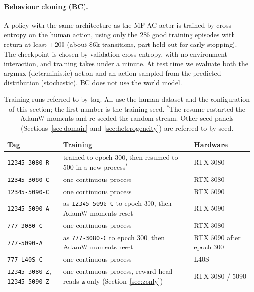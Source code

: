 \documentclass[11pt]{article}
\theoremstyle{remark}
\begin{document}
\paragraph{Behaviour cloning (BC).} A policy with the same architecture as the MF-AC actor is trained by cross-entropy on the human action, using only the $285$ good training episodes with return at least $+200$ (about $86$k transitions, part held out for early stopping). The checkpoint is chosen by validation cross-entropy, with no environment interaction, and training takes under a minute. At test time we evaluate both the argmax (deterministic) action and an action sampled from the predicted distribution (stochastic). BC does not use the world model.

\begin{table}[htbp]
\centering
\small
\begin{tabular}{@{}l >{\raggedright\arraybackslash}p{6.4cm} >{\raggedright\arraybackslash}p{2.9cm}@{}}
\toprule
\textbf{Tag} & \textbf{Training} & \textbf{Hardware} \\
\midrule
\texttt{12345-3080-R} & trained to epoch $300$, then resumed to $500$ in a new process$^{\ast}$ & RTX 3080 \\
\texttt{12345-3080-C} & one continuous process & RTX 3080 \\
\texttt{12345-5090-C} & one continuous process & RTX 5090 \\
\texttt{12345-5090-A} & as \texttt{12345-5090-C} to epoch $300$, then AdamW moments reset & RTX 5090 \\
\texttt{777-3080-C}   & one continuous process & RTX 3080 \\
\texttt{777-5090-A}   & as \texttt{777-3080-C} to epoch $300$, then AdamW moments reset & RTX 5090 after epoch $300$ \\
\texttt{777-L40S-C}   & one continuous process & L40S \\
\texttt{12345-3080-Z}, \texttt{12345-5090-Z} & one continuous process, reward head reads $\bm{z}$ only (Section~\ref{sec:zonly}) & RTX 3080 / 5090 \\
\bottomrule
\end{tabular}
\caption{Training runs referred to by tag. All use the human dataset and the configuration of this section; the first number is the training seed. $^{\ast}$The resume restarted the AdamW moments and re-seeded the random stream. Other seed panels (Sections~\ref{sec:domain} and~\ref{sec:heterogeneity}) are referred to by seed.}
\label{tab:runs}
\end{table}
\end{document}
